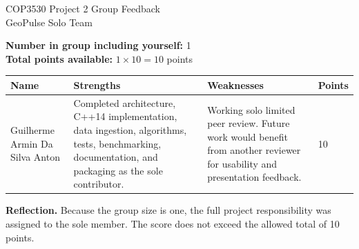 \documentclass[12pt]{article}
\begin{document}
\sloppy
\begin{center}
{\Large COP3530 Project 2 Group Feedback}\\[0.25in]
{\large GeoPulse Solo Team}
\end{center}

\noindent\textbf{Number in group including yourself:} 1\\
\textbf{Total points available:} $1 \times 10 = 10$ points\\[0.2in]

\small
\begin{tabularx}{\textwidth}{p{1.2in}Y Y p{0.45in}}
\toprule
Name & Strengths & Weaknesses & Points \\
\midrule
Guilherme Armin Da Silva Anton &
Completed architecture, C++14 implementation, data ingestion, algorithms,
tests, benchmarking, documentation, and packaging as the sole contributor. &
Working solo limited peer review. Future work would benefit from another
reviewer for usability and presentation feedback. &
10 \\
\bottomrule
\end{tabularx}
\normalsize

\vspace{0.2in}
\noindent\textbf{Reflection.} Because the group size is one, the full project
responsibility was assigned to the sole member. The score does not exceed the
allowed total of 10 points.
\end{document}
